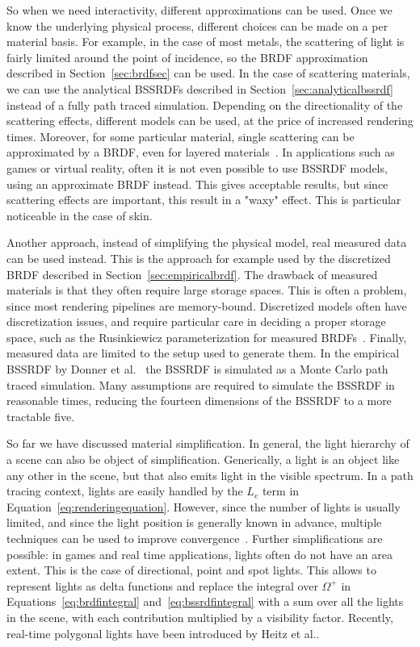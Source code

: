 So when we need interactivity, different approximations can be used. Once we know the underlying physical process, different choices can be made on a per material basis. For example, in the case of most metals, the scattering of light is fairly limited around the point of incidence, so the BRDF approximation described in Section~\ref{sec:brdfsec} can be used. In the case of scattering materials, we can use the analytical BSSRDFs described in Section~\ref{sec:analyticalbssrdf} instead of a fully path traced simulation. Depending on the directionality of the scattering effects, different models can be used, at the price of increased rendering times. Moreover, for some particular material, single scattering can be approximated by a BRDF, even for layered materials~\cite{Blinn1982, Hanrahan1993}. In applications such as games or virtual reality, often it is not even possible to use BSSRDF models, using an approximate BRDF instead. This gives acceptable results, but since scattering effects are important, this result in a "waxy" effect. This is particular noticeable in the case of skin. 

Another approach, instead of simplifying the physical model, real measured data can be used instead. This is the approach for example used by the discretized BRDF described in Section~\ref{sec:empiricalbrdf}. The drawback of measured materials is that they often require large storage spaces. This is often a problem, since most rendering pipelines are memory-bound. Discretized models often have discretization issues, and require particular care in deciding a proper storage space, such as the Rusinkiewicz parameterization for measured BRDFs~\cite{Rusinkiewicz1998}. Finally, measured data are limited to the setup used to generate them. In the empirical BSSRDF by Donner et al.~\cite{Donner2009} the BSSRDF is simulated as a Monte Carlo path traced simulation. Many assumptions are required to simulate the BSSRDF in reasonable times, reducing the fourteen dimensions of the BSSRDF to a more tractable five.  

So far we have discussed material simplification. In general, the light hierarchy of a scene can also be object of simplification. Generically, a light is an object like any other in the scene, but that also emits light in the visible spectrum. In a path tracing context, lights are easily handled by the $L_e$ term in Equation~\ref{eq:renderingequation}. However, since the number of lights is usually limited, and since the light position is generally known in advance, multiple techniques can be used to improve convergence~\cite{Shirley1996}. Further simplifications are possible: in games and real time applications, lights often do not have an area extent. This is the case of directional, point and spot lights. This allows to represent lights as delta functions and replace the integral over $\Omega^+$ in Equations~\ref{eq:brdfintegral} and~\ref{eq:bssrdfintegral} with a sum over all the lights in the scene, with each contribution multiplied by a visibility factor. Recently, real-time polygonal lights have been introduced by Heitz et al.\cite{Heitz2016}.

